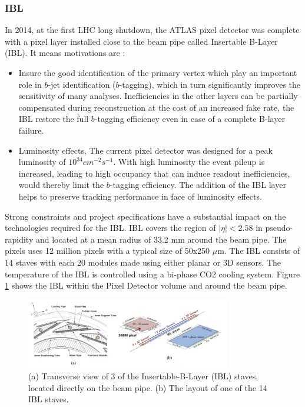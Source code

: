 \subsubsection{IBL}
\label{chap2:ATLAS:ITK:IBL}
In 2014, at the first LHC long shutdown, the ATLAS pixel detector was complete with a pixel layer installed close to the beam pipe called Insertable B-Layer (IBL). It means motivations are :
\begin{itemize}
	\item Insure the good identification of the primary vertex which play an important role in $b$-jet identification ($b$-tagging), which in turn significantly improves the sensitivity of many analyses. Inefficiencies in the other layers can be partially compensated during reconstruction at the cost of an increased fake rate, the IBL restore the full $b$-tagging efficiency even in case of a complete B-layer failure.
	\item Luminosity effects, The current pixel detector was designed for a peak luminosity of $10^{34} cm^{-2}s^{-1}$. With high luminosity the event pileup is increased, leading to high occupancy that can induce readout inefficiencies, would thereby limit the $b$-tagging efficiency. The addition of the IBL layer helps to preserve tracking performance in face of luminosity effects.
\end{itemize}
Strong constraints and project specifications have a substantial impact on the technologies required for the IBL. IBL covers the region of $|\eta|< 2.58$ in pseudo-rapidity and located at a mean radius of 33.2 mm around the beam pipe. The pixels uses 12 million pixels with a typical size of 50x250 $\mu$m. The IBL consists of 14 staves with each 20 modules made using either planar or 3D sensors. The temperature of the IBL is controlled using a bi-phase CO2 cooling system. Figure \ref{fig:chap2:ATLAS:ITK:IBL} shows the IBL within the Pixel Detector volume and around the beam pipe.
\begin{figure}[H]
    \centering
    \includegraphics[width=0.8\textwidth]{Ch2/Img/IBL.png}
    \caption{(a) Transverse view of 3 of the Insertable-B-Layer (IBL) staves, located directly on the beam pipe. (b) The layout of one of the 14 IBL staves.}
    \label{fig:chap2:ATLAS:ITK:IBL}
\end{figure}

